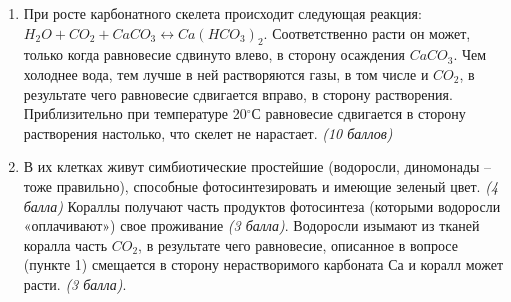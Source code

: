 \solutionSection
\begin{enumerate}
    \item При росте карбонатного скелета происходит следующая реакция:\\
    $H_2O+CO_2+CaCO_3 \leftrightarrow Ca(HCO_3)_2$. Соответственно расти он может, только когда равновесие сдвинуто влево, в сторону осаждения $CaCO_3$. Чем холоднее вода, тем лучше в ней растворяются газы, в том числе и $CO_2$, в результате чего равновесие сдвигается вправо, в сторону растворения. Приблизительно при температуре 20$^{\circ}$С равновесие сдвигается в сторону растворения настолько, что скелет не нарастает. \textit{(10 баллов)}
    \item В их клетках живут симбиотические простейшие (водоросли, диномонады – тоже правильно), способные фотосинтезировать и имеющие зеленый цвет. \textit{(4 балла)} Кораллы получают часть продуктов фотосинтеза (которыми водоросли «оплачивают») свое проживание \textit{(3 балла)}. Водоросли изымают из тканей коралла часть $CO_2$, в результате чего равновесие, описанное в вопросе (пункте 1) смещается в сторону нерастворимого карбоната $Са$ и коралл может расти. \textit{(3 балла)}.
    \end{enumerate}
